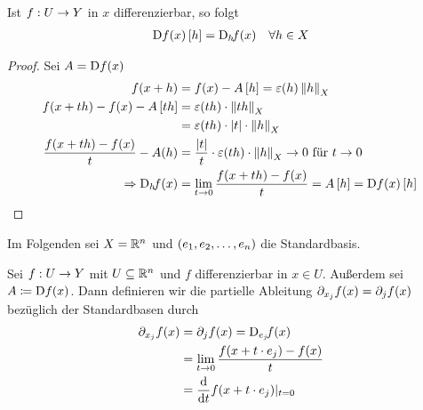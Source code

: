 \begin{satz} %
    Ist $f: U\rightarrow{} Y$ in $x$ differenzierbar, so folgt
    \begin{align*}
        \D f\of{x}\interv{h} = \text{D}_h\!f\of{x}\quad\forall h\in X
    \end{align*}
    \begin{proof}
        Sei $A = \D f\of{x}$
        \begin{align*}
            f\of{x+h} &= f\of{x} - A\interv{h} = \varepsilon\of{h}\norm{h}_X\\
            f\of{x+th} - f\of{x} - A\interv{th} &= \varepsilon\of{th}\cdot\norm{th}_X\\
            &= \varepsilon\of{th}\cdot\abs{t}\cdot\norm{h}_X\\
            \frac{f\of{x+th} - f\of{x}}{t} - A\of{h} &= \frac{\abs{t}}{t}\cdot\varepsilon\of{th} \cdot\norm{h}_X\fromto 0 \text{ für } t\fromto 0\\
            \impl \text{D}_h\!f\of{x} &= \lim_{t\fromto 0} \frac{f\of{x+th}- f\of{x}}{t} = A\interv{h} = \D f\of{x}\interv{h}\qedhere
        \end{align*}
    \end{proof}
\end{satz}

\begin{mdframed}
    \begin{center}
        Im Folgenden sei $X=\mathbb{R}^n$ und $\left(e_1, e_2, \ldots, e_n\right)$ die Standardbasis.
    \end{center}
\end{mdframed}

\begin{definition}
    Sei $f: U\rightarrow{} Y$ mit $U\subseteq \mathbb{R}^n$ und $f$ differenzierbar in $x\in U$. Außerdem sei $A \coloneqq \D f\of{x}$. Dann definieren wir die partielle Ableitung $\partial_{x_j} f\of{x} = \partial_j f\of{x}$ bezüglich der Standardbasen durch
    \begin{align*}
        \partial_{x_j} f\of{x} &= \partial_j f\of{x} = \text{D}_{e_j}\! f\of{x}\\
        &= \lim_{t\fromto 0} \frac{f\of{x+t\cdot e_j} - f\of{x}}{t}\\
        &= \frac{\dif}{\dif t}f\of{x+t\cdot e_j}\vert_{t = 0}
    \end{align*}
\end{definition}

